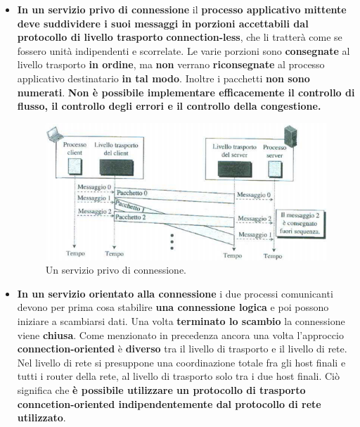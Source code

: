 \documentclass[11pt,a4paper]{article}
\theoremstyle{definition}
\begin{document}
\begin{itemize}
	\item \textbf{In un servizio privo di connessione} il \textbf{processo applicativo mittente  deve suddividere i suoi messaggi in porzioni accettabili dal protocollo di livello trasporto} \textbf{connection-less}, che li tratterà come se fossero unità indipendenti e scorrelate. Le varie porzioni sono \textbf{consegnate} al livello trasporto \textbf{in ordine}, ma \textbf{non} verrano \textbf{riconsegnate} al processo applicativo destinatario \textbf{in tal modo}. Inoltre i pacchetti \textbf{non sono numerati}. \textbf{Non è possibile implementare efficacemente il controllo di flusso, il controllo degli errori e il controllo della congestione.}
	      \begin{figure}[!h]
		      \includegraphics[scale=0.5]{Immagini/Connection_less.png}
		      \centering
		      \caption{Un servizio privo di connessione.}
	      \end{figure}
	\item \textbf{In un servizio orientato alla connessione} i due processi comunicanti devono per prima cosa stabilire \textbf{una connessione logica} e poi possono iniziare a scambiarsi dati. Una volta \textbf{terminato lo scambio} la connessione viene \textbf{chiusa}. Come menzionato in precedenza ancora una volta l'approccio \textbf{connection-oriented} è \textbf{diverso} tra il livello di trasporto e il livello di rete. Nel livello di rete si presuppone una coordinazione totale fra gli host finali e tutti i router della rete, al livello di trasporto solo tra i due host finali. Ciò significa che \textbf{è possibile utilizzare un protocollo di trasporto conncetion-oriented indipendentemente dal protocollo di rete utilizzato}.
\end{itemize}
\newpage
\end{document}
